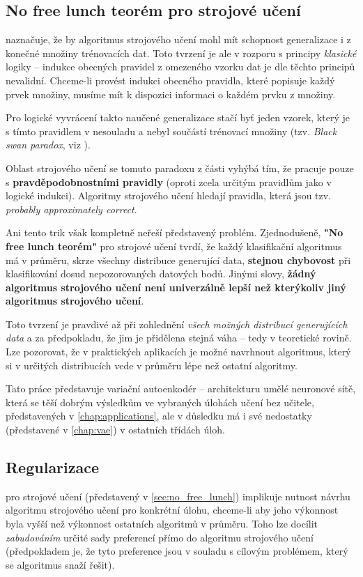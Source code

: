 \subsection{No free lunch teorém pro strojové učení}
\label{sec:no_free_lunch}
\textcite{Vapnik2000} naznačuje, že by algoritmus strojového učení mohl mít schopnost generalizace i z konečné množiny trénovacích dat. 
Toto tvrzení je ale v rozporu s principy \emph{klasické} logiky – indukce obecných pravidel \cite{Hume1978} z omezeného vzorku dat je dle těchto principů nevalidní.
Chceme-li provést indukci obecného pravidla, které popisuje každý prvek množiny, musíme mít k dispozici informaci o každém prvku z množiny.  \cite{Goodfellow2016}

Pro logické vyvrácení takto naučené generalizace stačí byť jeden vzorek, který je s tímto pravidlem v nesouladu a nebyl součástí trénovací množiny (tzv. \emph{Black swan paradox}, viz \textcite{Taleb2008}).

Oblast strojového učení se tomuto paradoxu z části vyhýbá tím, že pracuje pouze s \textbf{pravděpodobnostními pravidly} (oproti zcela určitým pravidlům jako v logické indukci).
Algoritmy strojového učení hledají pravidla, která jsou tzv. \emph{probably approximately correct}. \cite{Valiant1984}

Ani tento trik však kompletně neřeší představený problém. Zjednodušeně, \textbf{"No free lunch teorém"} pro strojové učení tvrdí, že každý klasifikační algoritmus má v průměru, skrze všechny distribuce generující data, \textbf{stejnou chybovost} při klasifikování dosud nepozorovaných datových bodů. \cite{Wolpert1996}
Jinými slovy, \textbf{žádný algoritmus strojového učení není univerzálně lepší než kterýkoliv jiný algoritmus strojového učení}.

Toto tvrzení je pravdivé až při zohlednění \emph{všech možných distribucí generujících data} a za předpokladu, že jim je přidělena stejná váha \cite{Hibbard2009} – tedy v teoretické rovině.
Lze pozorovat, že v praktických aplikacích je možné navrhnout algoritmus, který si v určitých distribucích vede v průměru lépe než ostatní algoritmy. \cite{Goodfellow2016}

Tato práce představuje variační autoenkodér – architekturu umělé neuronové sítě, která se těší dobrým výsledkům ve vybraných úlohách učení bez učitele, představených v \autoref{chap:applications}, ale v důsledku má i své nedostatky (představené v \autoref{chap:vae}) v ostatních třídách úloh.

\subsection{Regularizace}
\label{sec:regularization}
 pro strojové učení (představený v \autoref{sec:no_free_lunch}) implikuje nutnost návrhu algoritmu strojového učení pro konkrétní úlohu, chceme-li aby jeho výkonnost byla vyšší než výkonnost ostatních algoritmů v průměru.
Toho lze docílit \emph{zabudováním} určité sady preferencí přímo do algoritmu strojového učení (předpokladem je, že tyto preference jsou v souladu s cílovým problémem, který se algoritmus snaží řešit). \cite{Goodfellow2016}


